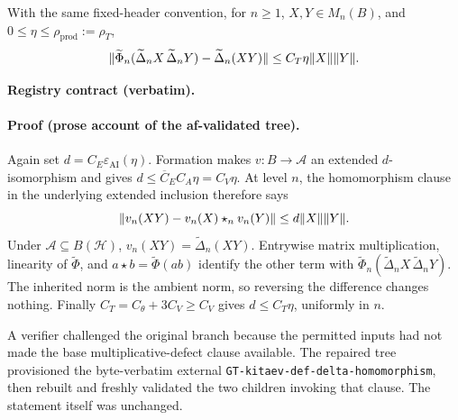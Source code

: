 \begin{lemma}\label{lem:routef-raw-product-estimate}
With the same fixed-header convention, for $n\ge1$, $X,Y\in M_n(B)$, and
$0\le\eta\le\rho_{\mathrm{prod}}:=\rho_T$,
\[
 \lVert \widetilde\Phi_n(\widetilde\Delta_nX\,\widetilde\Delta_nY)
       -\widetilde\Delta_n(XY)\rVert
 \le C_T\eta\lVert X\rVert\lVert Y\rVert.
\]
\end{lemma}
\noindent\textbf{Registry contract (verbatim).}

\paragraph{Proof (prose account of the af-validated tree).}
Again set $d=C_E\varepsilon_{\mathrm{AI}}(\eta)$.  Formation makes
$v:B\to\mathcal A$ an extended $d$-isomorphism and gives
$d\le\overline C_EC_A\eta=C_V\eta$.  At level $n$, the homomorphism clause in
the underlying extended inclusion therefore says
\[
 \lVert v_n(XY)-v_n(X)\star_n v_n(Y)\rVert\le d\lVert X\rVert\lVert Y\rVert.
\]
Under $\mathcal A\subseteq B(\mathcal H)$, $v_n(XY)=\widetilde\Delta_n(XY)$.
Entrywise matrix multiplication, linearity of $\widetilde\Phi$, and
$a\star b=\widetilde\Phi(ab)$ identify the other term with
$\widetilde\Phi_n(\widetilde\Delta_nX\,\widetilde\Delta_nY)$.
The inherited norm is the ambient norm, so reversing the difference changes nothing.
Finally $C_T=C_\theta+3C_V\ge C_V$ gives $d\le C_T\eta$, uniformly in $n$.

A verifier challenged the original branch because the permitted inputs had not made
the base multiplicative-defect clause available.  The repaired tree provisioned the
byte-verbatim external \texttt{GT-kitaev-def-delta-homomorphism}, then rebuilt and freshly
validated the two children invoking that clause.  The statement itself was unchanged.

